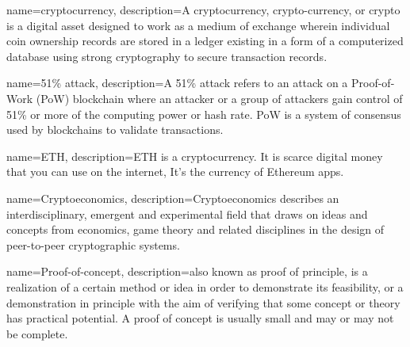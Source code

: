 \makeglossaries
 
{
    name=cryptocurrency,
    description={A cryptocurrency, crypto-currency, or crypto is a digital asset designed to work as a medium of exchange wherein individual coin ownership records are stored in a ledger existing in a form of a computerized database using strong cryptography to secure transaction records.}
}

{
    name=51\% attack,
    description={A 51\% attack refers to an attack on a Proof-of-Work (PoW) blockchain where an attacker or a group of attackers gain control of 51\% or more of the computing power or hash rate. PoW is a system of consensus used by blockchains to validate transactions.}
}

{
    name=ETH,
    description={ETH is a cryptocurrency. It is scarce digital money that you can use on the internet, It's the currency of Ethereum apps.}
}

{
    name=Cryptoeconomics,
    description={Cryptoeconomics describes an interdisciplinary, emergent and experimental field that draws on ideas and concepts from economics, game theory and related disciplines in the design of peer-to-peer cryptographic systems.}
}

{
    name=Proof-of-concept,
    description={also known as proof of principle, is a realization of a certain method or idea in order to demonstrate its feasibility, or a demonstration in principle with the aim of verifying that some concept or theory has practical potential. A proof of concept is usually small and may or may not be complete.}
}